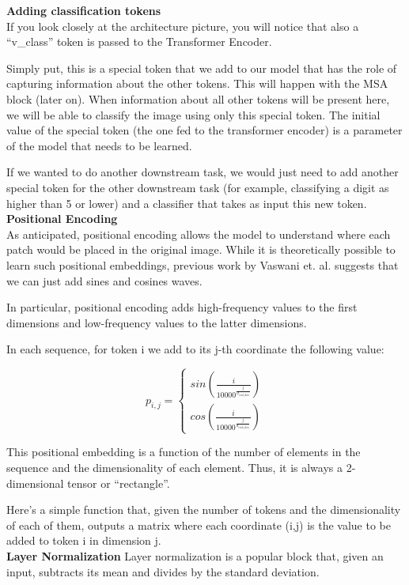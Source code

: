 \textbf{Adding classification tokens} \\
If you look closely at the architecture picture, you will notice that also a “v\_class” token is passed to the Transformer Encoder.

Simply put, this is a special token that we add to our model that has the role of capturing information about the other tokens. This will happen with the MSA block (later on). When information about all other tokens will be present here, we will be able to classify the image using only this special token. The initial value of the special token (the one fed to the transformer encoder) is a parameter of the model that needs to be learned.

If we wanted to do another downstream task, we would just need to add another special token for the other downstream task (for example, classifying a digit as higher than 5 or lower) and a classifier that takes as input this new token.\\

\textbf{Positional Encoding} \\
As anticipated, positional encoding allows the model to understand where each patch would be placed in the original image. While it is theoretically possible to learn such positional embeddings, previous work by Vaswani et. al. suggests that we can just add sines and cosines waves.

In particular, positional encoding adds high-frequency values to the first dimensions and low-frequency values to the latter dimensions.

In each sequence, for token i we add to its j-th coordinate the following value:


\[p_{i, j} = \left\{\begin{matrix}
sin\left(\frac{i}{10000^{\frac{j}{d_{emb\_dim}}}}\right) \\ cos\left(\frac{i}{10000^{\frac{j}{d_{emb\_dim}}}}\right)
\end{matrix}\right.\]

This positional embedding is a function of the number of elements in the sequence and the dimensionality of each element. Thus, it is always a 2-dimensional tensor or “rectangle”.

Here’s a simple function that, given the number of tokens and the dimensionality of each of them, outputs a matrix where each coordinate (i,j) is the value to be added to token i in dimension j.\\

\textbf{Layer Normalization}
Layer normalization is a popular block that, given an input, subtracts its mean and divides by the standard deviation.

